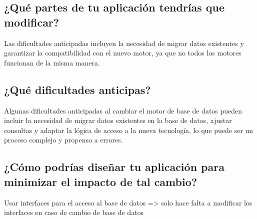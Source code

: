 \subsection*{¿Qué partes de tu aplicación tendrías que modificar?}
Las dificultades anticipadas incluyen la necesidad de migrar datos existentes y garantizar la compatibilidad con el nuevo motor, ya que no todos los motores funcionan de la misma manera.

\subsection*{¿Qué dificultades anticipas?}
Algunas dificultades anticipadas al cambiar el motor de base de datos pueden incluir la necesidad de migrar datos existentes en la base de datos, ajustar consultas y adaptar la lógica de acceso a la nueva tecnología, lo que puede ser un proceso complejo y propenso a errores.

\subsection*{¿Cómo podrías diseñar tu aplicación para minimizar el impacto de tal cambio?}
Usar interfaces para el acceso al base de datos => solo hace falta a modificar los interfaces en caso de cambio de base de datos
